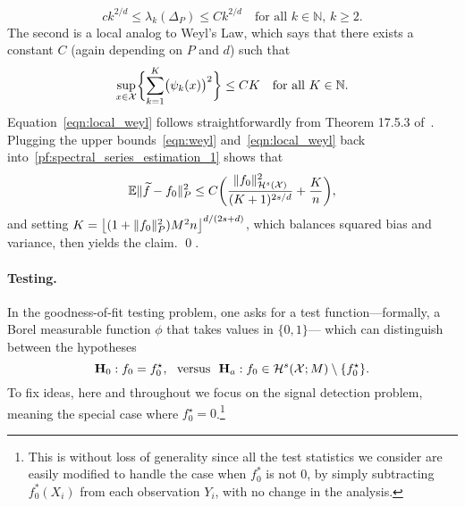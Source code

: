 \begin{equation}
\label{eqn:weyl}
ck^{2/d} \leq \lambda_k(\Delta_P) \leq Ck^{2/d}\quad\textrm{for all $k \in \mathbb{N}$, $k \geq 2$}.
\end{equation}
The second is a local analog to Weyl's Law, which says that there exists a constant $C$ (again depending on $P$ and $d$) such that
\begin{equation}
\label{eqn:local_weyl}
\sup_{x \in \mathcal{X}}\biggl\{\sum_{k = 1}^{K} \bigl(\psi_k(x)\bigr)^2\biggr\} \leq CK \quad\textrm{for all $K \in \mathbb{N}$}.
\end{equation}
Equation~\eqref{eqn:local_weyl} follows straightforwardly from Theorem 17.5.3 of~\cite{hormander1973}. Plugging the upper bounds~\eqref{eqn:weyl} and~\eqref{eqn:local_weyl} back into~\eqref{pf:spectral_series_estimation_1} shows that
\begin{equation}
\label{pf:spectral_series_estimation_3}
\mathbb{E} \|\widetilde{f} - f_0\|_P^2 \leq C\biggl(\frac{\|f_0\|_{\mathcal{H}^s(\mathcal{X})}^2}{(K + 1)^{2s/d}} + \frac{K}{n}\biggr),
\end{equation}
and setting $K = \left\lfloor (1 + \|f_0\|_{P}^2)M^2n \right\rfloor^{d/(2s + d)}$, which balances squared bias and variance, then yields the claim.
\qed.

\paragraph{Testing.}
In the goodness-of-fit testing problem, one asks for a test function---formally, a Borel measurable function $\phi$ that takes values in $\{0,1\}$--- which can distinguish between the hypotheses
\begin{equation}
\mathbf{H}_0: f_0 = f_0^{\star}, ~~\textrm{versus}~~ \mathbf{H}_a: f_0 \in \mathcal{H}^{s}(\mathcal{X};M) \setminus \{f_0^{\star}\}.
\end{equation} 
To fix ideas, here and throughout we focus on the signal detection problem, meaning the special case where $f_0^{\star} = 0$.\footnote{This is without loss of generality since all the test statistics we consider are easily modified to handle the case when $f_0^{\ast}$ is not $0$, by simply subtracting $f_0^{\ast}(X_i)$ from each observation $Y_i$, with no change in the analysis.}

